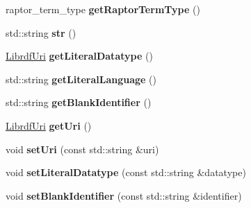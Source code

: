 \begin{DoxyCompactItemize}
\item 
\mbox{\label{classredland_1_1LibrdfNode_a83ec604f27e71cea80ac49569a06ddfe}} 
raptor\+\_\+term\+\_\+type {\bfseries get\+Raptor\+Term\+Type} ()
\item 
\mbox{\label{classredland_1_1LibrdfNode_a528bc0251daa0907e4891fe06e47c567}} 
std\+::string {\bfseries str} ()
\item 
\mbox{\label{classredland_1_1LibrdfNode_a98487d5af58971d820fcb99c88d8712d}} 
\hyperlink{classredland_1_1LibrdfUri}{Librdf\+Uri} {\bfseries get\+Literal\+Datatype} ()
\item 
\mbox{\label{classredland_1_1LibrdfNode_a58b9962c783be77fd0d2cb7036bfdc6a}} 
std\+::string {\bfseries get\+Literal\+Language} ()
\item 
\mbox{\label{classredland_1_1LibrdfNode_a49431de8c3262ee56d533a5fe047ee00}} 
std\+::string {\bfseries get\+Blank\+Identifier} ()
\item 
\mbox{\label{classredland_1_1LibrdfNode_a0dd2ff697c0753eddf7327f64390ed77}} 
\hyperlink{classredland_1_1LibrdfUri}{Librdf\+Uri} {\bfseries get\+Uri} ()
\item 
\mbox{\label{classredland_1_1LibrdfNode_a01aeb7675187379674746f803a1fbdc9}} 
void {\bfseries set\+Uri} (const std\+::string \&uri)
\item 
\mbox{\label{classredland_1_1LibrdfNode_a160db9f7c7636c339e12c26f519b8fff}} 
void {\bfseries set\+Literal\+Datatype} (const std\+::string \&datatype)
\item 
\mbox{\label{classredland_1_1LibrdfNode_afd81499fe4125cc2f4c472d33fb6c8c0}} 
void {\bfseries set\+Blank\+Identifier} (const std\+::string \&identifier)
\end{DoxyCompactItemize}
